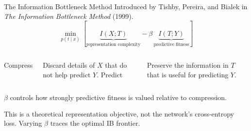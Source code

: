 \documentclass[aspectratio=169,11pt]{beamer}
\newcommand{\mutualinfo}[2]{I\!\left(#1;#2\right)}
\begin{document}
\begin{frame}{The Information Bottleneck Method}
  \centering
  {\color{Muted}\small Introduced by Tishby, Pereira, and Bialek in
  \emph{The Information Bottleneck Method} (1999).}
  \vspace{-0.05cm}
  \[
    \boxed{
      \min_{p(t\mid x)}
      \left[
        \underbrace{\mutualinfo{X}{T}}_{\text{representation complexity}}
        - \beta\,
        \underbrace{\mutualinfo{T}{Y}}_{\text{predictive fitness}}
      \right]
    }
  \]
  \vspace{0.35cm}
  \begin{columns}[T,onlytextwidth]
      \centering
      {\color{Accent}\large Compress}\par
      \vspace{0.15cm}
      Discard details of $X$ that do not help predict $Y$.
      \centering
      {\color{Teal}\large Predict}\par
      \vspace{0.15cm}
      Preserve the information in $T$ that is useful for predicting $Y$.
  \end{columns}
  \vspace{0.35cm}
  $\beta$ controls how strongly predictive fitness is valued relative to compression.\par
  \vspace{0.12cm}
  {\color{Muted}\small This is a theoretical representation objective, not the
  network's cross-entropy loss. Varying $\beta$ traces the optimal IB frontier.}
\end{frame}
\end{document}
